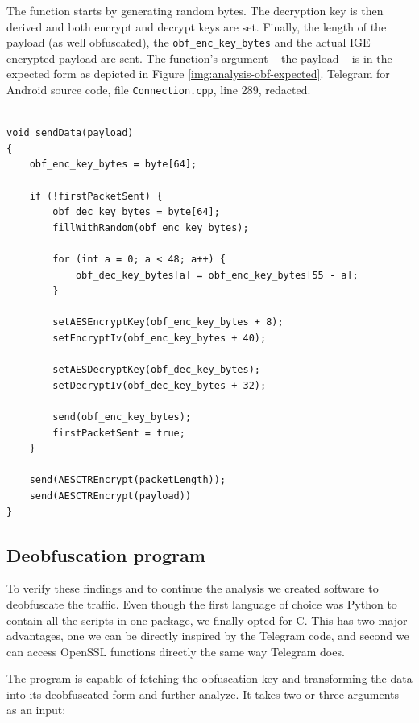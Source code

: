 \documentclass[thesis=M,english]{FITthesis}[2012/10/20]
\newcommand{\cpp}{C\nolinebreak\hspace{-.05em}\raisebox{.4ex}{\tiny +}\nolinebreak\hspace{-.10em}\raisebox{.4ex}{\tiny +}}
\begin{document}
\begin{listing}[htb]
\caption{The function starts by generating random bytes. The decryption key is then derived and both encrypt and decrypt keys are set. Finally, the length of the payload (as well obfuscated), the \texttt{obf\_enc\_key\_bytes} and the actual IGE encrypted payload are sent. The function's argument -- the payload -- is in the expected form as depicted in Figure \ref{img:analysis-obf-expected}.
\protect\linebreak Telegram for Android source code, file \texttt{Connection.cpp}, line 289, redacted.}
\label{lst:analysis-obfuscation}
\begin{verbatim}

void sendData(payload)
{
    obf_enc_key_bytes = byte[64];

    if (!firstPacketSent) {
        obf_dec_key_bytes = byte[64];
        fillWithRandom(obf_enc_key_bytes);

        for (int a = 0; a < 48; a++) {
            obf_dec_key_bytes[a] = obf_enc_key_bytes[55 - a];
        }

        setAESEncryptKey(obf_enc_key_bytes + 8);
        setEncryptIv(obf_enc_key_bytes + 40);

        setAESDecryptKey(obf_dec_key_bytes);
        setDecryptIv(obf_dec_key_bytes + 32);
        
        send(obf_enc_key_bytes);
        firstPacketSent = true;
    }

    send(AESCTREncrypt(packetLength));
    send(AESCTREncrypt(payload))
}
\end{verbatim}
\end{listing}

\subsection{Deobfuscation program}\label{analysis-obf-program}

To verify these findings and to continue the analysis we created software to deobfuscate the traffic. Even though the first language of choice was Python to contain all the scripts in one package, we finally opted for \cpp. This has two major advantages, one we can be directly inspired by the Telegram code, and second we can access OpenSSL functions directly the same way Telegram does.

The program is capable of fetching the obfuscation key and transforming the data into its deobfuscated form and further analyze. It takes two or three arguments as an input:
\end{document}
